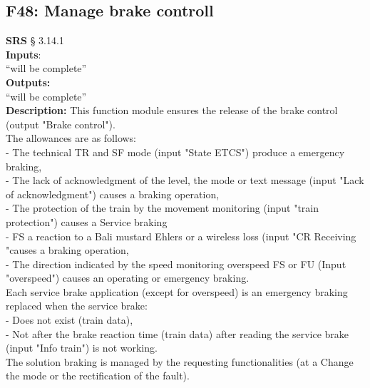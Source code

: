 \documentclass{template/openetcs_report}
\begin{document}
\subsection {F48: Manage brake controll}
\textbf{SRS} § 3.14.1\\

\textbf{Inputs}:\\
``will be complete''\\
 
 \textbf{Outputs:}\\
 ``will be complete''\\
 
 \textbf{Description:} 
This function module ensures the release of the brake control (output 
"Brake control"). \\

The allowances are as follows: \\
 
 - The technical TR and SF mode (input "State ETCS") produce a 
emergency braking, \\

- The lack of acknowledgment of the level, the mode or text message (input 
"Lack of acknowledgment") causes a braking operation, \\

- The protection of the train by the movement monitoring (input "train protection") causes a 
Service braking \\

- FS a reaction to a Bali mustard Ehlers or a wireless loss (input "CR 
Receiving "causes a braking operation, \\

- The direction indicated by the speed monitoring overspeed FS or FU 
(Input "overspeed") causes an operating or emergency braking. \\

Each service brake application (except for overspeed) is an emergency braking 
replaced when the service brake: \\

- Does not exist (train data), \\

- Not after the brake reaction time (train data) after reading the service brake (input 
"Info train") is not working. \\

The solution braking is managed by the requesting functionalities (at a 
Change the mode or the rectification of the fault).\\
\end{document}
